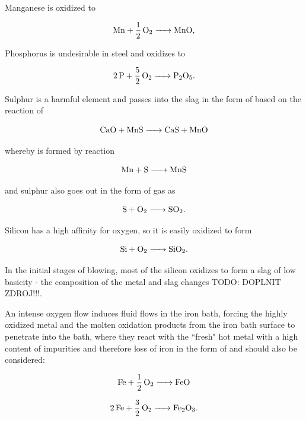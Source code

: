 Manganese is oxidized to 

\begin{equation}
	\ce{ Mn + 1/2 O2 -> MnO },
\end{equation}

Phosphorus is undesirable in steel and oxidizes to 

\begin{equation}
	\ce{ 2P + 5/2 O2 -> P2O5 }.
\end{equation}

Sulphur is a harmful element and passes into the slag in the form of  based on the reaction of 

\begin{equation}
	\ce{ CaO + MnS -> CaS + MnO }
\end{equation}

whereby  is formed by reaction

\begin{equation}
	\ce{ Mn + S -> MnS }
\end{equation}

and sulphur also goes out in the form of gas as 

\begin{equation}
	\ce{ S + O2 -> SO2 }.
\end{equation}

Silicon has a high affinity for oxygen, so it is easily oxidized to form 

\begin{equation}
	\ce{ Si + O2 -> SiO2 }.
\end{equation}

In the initial stages of blowing, most of the silicon oxidizes to form a slag of low basicity - the composition of the metal and slag changes TODO: DOPLNIT ZDROJ!!!. 

An intense oxygen flow induces fluid flows in the iron bath, forcing the highly oxidized metal and the molten oxidation products from the iron bath surface to penetrate into the bath, where they react with the ``fresh" hot metal with a high content of impurities and therefore loss of iron in the form of  and should also be considered:

\begin{equation}
	\ce{ Fe + 1/2 O2 -> FeO }
\end{equation}

\begin{equation}
	\ce{ 2Fe + 3/2 O2 -> Fe2O3 }.
\end{equation}

